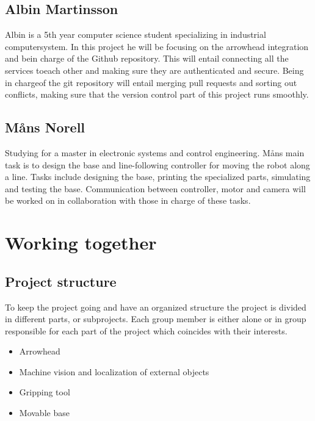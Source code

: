 \section*{Albin Martinsson}
Albin is a 5th year computer science student specializing in industrial computersystem. 
In this project he will be focusing on the arrowhead integration and bein charge of the Github repository.  
This will entail connecting all the services toeach other and making sure they are authenticated and secure.  
Being in chargeof the git repository will entail merging pull requests and sorting out conflicts,
making sure that the version control part of this project runs smoothly.


\section*{Måns Norell}
Studying for a master in electronic systems and control engineering.
Måns main task is to design the base and line-following controller for moving the robot along a line. 
Tasks include designing the base, printing the specialized parts, simulating and testing the base.
Communication between controller, motor and camera will be worked on in collaboration with those in charge of these tasks. 


\chapter{Working together}
\section*{Project structure}
To keep the project going and have an organized structure the project is divided 
in different parts, or subprojects. Each group member is either alone or in group responsible for each part of the project which coincides with their interests. 
\begin{itemize}
    \item Arrowhead
    \item Machine vision and localization of external objects
    \item Gripping tool
    \item Movable base
\end{itemize}

